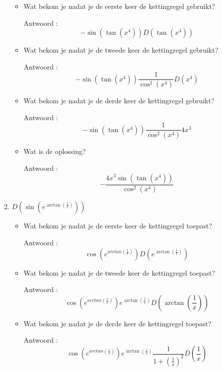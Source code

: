 \begin{enumerate}
	\begin{itemize}
		
		\item Wat bekom je nadat je de eerste keer de kettingregel gebruikt?
		
		Antwoord : \[-\sin \left( \tan \left(  x^4  \right)  \right)D \left( \tan \left( x^4  \right)  \right)\]
		
		\item Wat bekom je nadat je de tweede keer de kettingregel gebruikt?
		
		Antwoord : \[-\sin \left( \tan \left(  x^4  \right)  \right)\frac{1}{\cos^2 \left( x^4  \right)}D\left(  x^4 \right)\]
		
		\item Wat bekom je nadat je de derde keer de kettingregel gebruikt?
		
		Antwoord :  \[-\sin \left( \tan \left(  x^4  \right)  \right)\frac{1}{\cos^2 \left( x^4  \right)}4x^3\]
		
		\item Wat is de oplossing?
		
		Antwoord : \[-\frac{4x^3\sin \left( \tan \left(  x^4  \right)  \right)}{\cos^2 \left( x^4  \right)}\]
		
	\end{itemize}
	
	\item $D \left(  \sin \left(  e^{\arctan \left(  \frac{1}{x}  \right) } \right)  \right)$
	
	\begin{itemize}
		
		\item Wat bekom je nadat je de eerste keer de kettingregel toepast?
		
		Antwoord : \[\cos \left(  e^{arctan \left(  \frac{1}{x}  \right) } \right) D \left(  e^{\arctan \left(  \frac{1}{x}  \right) }  \right)\]
		
		\item Wat bekom je nadat je de tweede keer de kettingregel toepast?
		
		Antwoord : \[\cos \left(  e^{arctan \left(  \frac{1}{x}  \right) } \right) e^{\arctan \left(  \frac{1}{x}  \right) }D \left( \arctan \left(  \frac{1}{x}  \right)  \right)\]
		
		\item Wat bekom je nadat je de derde keer de kettingregel toepast?
		
		Antwoord : \[\cos \left(  e^{arctan \left(  \frac{1}{x}  \right) } \right) e^{\arctan \left(  \frac{1}{x}  \right) }\frac{1}{1+\left( \frac{1}{x}  \right)^2}D\left( \frac{1}{x}  \right)\]
		

\end{itemize}
\end{enumerate}

